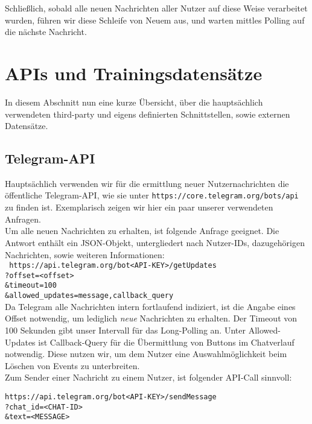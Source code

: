 Schließlich, sobald alle neuen Nachrichten aller Nutzer auf diese Weise verarbeitet wurden, führen wir diese Schleife von Neuem aus, und warten mittles Polling auf die nächste Nachricht.

\section{APIs und Trainingsdatensätze}
In diesem Abschnitt nun eine kurze Übersicht, über die hauptsächlich verwendeten third-party und eigens definierten Schnittstellen, sowie externen Datensätze.

\subsection{Telegram-API}

Hauptsächlich verwenden wir für die ermittlung neuer Nutzernachrichten die öffentliche Telegram-API, wie sie unter \texttt{https://core.telegram.org/bots/api} zu finden ist. Exemplarisch zeigen wir hier ein paar unserer verwendeten Anfragen.\\

Um alle neuen Nachrichten zu erhalten, ist folgende Anfrage geeignet. Die Antwort enthält ein JSON-Objekt, untergliedert nach Nutzer-IDs, dazugehörigen Nachrichten, sowie weiteren Informationen:\\

	\texttt{
		https://api.telegram.org/bot<API-KEY>/getUpdates\\?offset=<offset>\\\&timeout=100\\\&allowed\_updates=message,callback\_query
	}\\

Da Telegram alle Nachrichten intern fortlaufend indiziert, ist die Angabe eines Offset notwendig, um lediglich \textit{neue} Nachrichten zu erhalten. Der Timeout von 100 Sekunden gibt unser Intervall für das Long-Polling an. Unter Allowed-Updates ist Callback-Query für die Übermittlung von Buttons im Chatverlauf notwendig. Diese nutzen wir, um dem Nutzer eine Auswahlmöglichkeit beim Löschen von Events zu unterbreiten.\\

Zum Sender einer Nachricht zu einem Nutzer, ist folgender API-Call sinnvoll:

\texttt{https://api.telegram.org/bot<API-KEY>/sendMessage\\?chat\_id=<CHAT-ID>\\\&text=<MESSAGE>}\\

